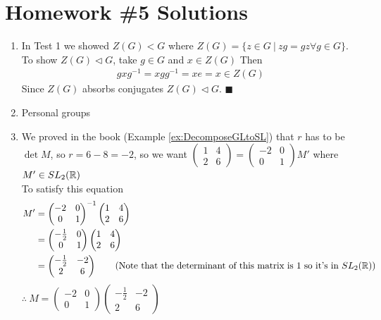 \section{Homework \#5 Solutions}

\begin{enumerate}
    \item In Test 1 we showed $Z(G)<G$ where $Z(G)=\{z\in G \ | \ zg=gz \forall g \in G \}$. \\ 
    To show $Z(G)\triangleleft G$, take $g\in G$ and $x \in Z(G)$ 
    Then 
    \begin{align*}
        gxg^{-1} = xgg^{-1} = x e = x \in Z(G)
    \end{align*}
    Since $Z(G)$ absorbs conjugates $Z(G)\triangleleft G$. $\blacksquare$ 

    \item Personal groups
    \item We proved in the book (Example \ref{ex:DecomposeGLtoSL}) that $r$ has to be $\det M$, so $r=6-8 = -2$, so we want 
    $\begin{pmatrix}
        1 &4 \\ 2&6
    \end{pmatrix} = \begin{pmatrix}
        -2 & 0 \\ 0 & 1
    \end{pmatrix} M'$ where $M' \in SL_2({\mathbb{ R}})$ \\
    To satisfy this equation 
    \begin{align*}
        M' &= \begin{pmatrix}
        -2 & 0 \\ 0 & 1
    \end{pmatrix}^{-1} \begin{pmatrix}
        1 &4 \\ 2&6
    \end{pmatrix} \\
    &= \begin{pmatrix}
        -\frac{1}{2} & 0 \\ 0 & 1
    \end{pmatrix}  \begin{pmatrix}
        1 &4 \\ 2&6
    \end{pmatrix} \\
    &= \begin{pmatrix}
        -\frac{1}{2} & -2 \\ 2 & 6
    \end{pmatrix} \ \ \ \ \ \ (\text{Note that the determinant of this matrix is }1 \text{ so it's in }SL_2({\mathbb{ R}}))
    \end{align*}
    $\therefore \ M = \begin{pmatrix}
        -2 & 0 \\ 0 & 1
    \end{pmatrix} \begin{pmatrix}
        -\frac{1}{2} & -2 \\ 2 & 6
    \end{pmatrix}$


\end{enumerate}
